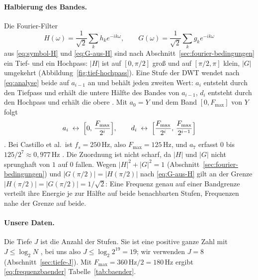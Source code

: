 \documentclass[a4paper,11pt,bibliography=totoc,listof=totoc,headinclude=true,cleardoublepage=empty,oneside]{scrbook}
\theoremstyle{plain}
\theoremstyle{definition}
\begin{document}
\paragraph{Halbierung des Bandes.}
Die Fourier-Filter
\[
  H(\omega) = \frac{1}{\sqrt2}\sum_k h_k e^{-ik\omega}, \qquad
  G(\omega) = \frac{1}{\sqrt2}\sum_k g_k e^{-ik\omega}
\]
aus \eqref{eq:symbol-H} und \eqref{eq:G-aus-H} sind nach
Abschnitt~\ref{sec:fourier-bedingungen} ein Tief- und ein Hochpass:
$\lvert H\rvert$ ist auf $[0,\pi/2]$ gro\ss{} und auf $[\pi/2,\pi]$ klein,
$\lvert G\rvert$ umgekehrt (Abbildung~\ref{fig:tief-hochpass}).
Eine Stufe der DWT wendet nach \eqref{eq:analyse} beide auf $a_{i-1}$ an und
behält jeden zweiten Wert: $a_i$ entsteht durch den Tiefpass und erhält die
untere Hälfte des Bandes von $a_{i-1}$, $d_i$ entsteht durch den Hochpass und
erhält die obere \cite[Abschn.~3.1.2]{castillo}. %
Mit $a_0 = Y$ und dem Band $[0, F_{\max}]$ von $Y$ folgt
\begin{equation}
\label{eq:frequenzbaender}
  a_i \;\leftrightarrow\; \Bigl[0,\,\frac{F_{\max}}{2^{i}}\Bigr],
  \qquad
  d_i \;\leftrightarrow\; \Bigl[\frac{F_{\max}}{2^{i}},\,\frac{F_{\max}}{2^{i-1}}\Bigr]
\end{equation}
\cite[Kap.~2.3.2, Tab.~2.4]{rebstadt}. %
Bei Castillo et al.\ ist $f_s = 250$\,Hz, also $F_{\max} = 125$\,Hz, und $a_7$
erfasst $0$ bis $125/2^7 \approx 0{,}977$\,Hz \cite[Abschn.~3.1.2]{castillo}. %
Die Zuordnung ist nicht scharf, da $\lvert H\rvert$ und $\lvert G\rvert$
nicht sprunghaft von $1$ auf $0$ fallen. Wegen
$\lvert H\rvert^2 + \lvert G\rvert^2 = 1$
(Abschnitt~\ref{sec:fourier-bedingungen}) und
$\lvert G(\pi/2)\rvert = \lvert H(\pi/2)\rvert$ nach \eqref{eq:G-aus-H} gilt
an der Grenze $\lvert H(\pi/2)\rvert = \lvert G(\pi/2)\rvert = 1/\sqrt2$:
Eine Frequenz genau auf einer Bandgrenze verteilt ihre Energie je zur Hälfte
auf beide benachbarten Stufen, Frequenzen nahe der Grenze auf beide.

\paragraph{Unsere Daten.}
Die Tiefe $J$ ist die Anzahl der Stufen. Sie ist eine positive ganze Zahl mit
$J \le \log_2 N$ \cite[Abschn.~3.1.2]{castillo}, %
bei uns also $J \le \log_2 2^{19} = 19$; wir verwenden $J = 8$
(Abschnitt~\ref{sec:tiefe-J}). Mit $F_{\max} = 360\,\mathrm{Hz}/2 = 180$\,Hz
ergibt \eqref{eq:frequenzbaender} Tabelle~\ref{tab:baender}.
\end{document}
